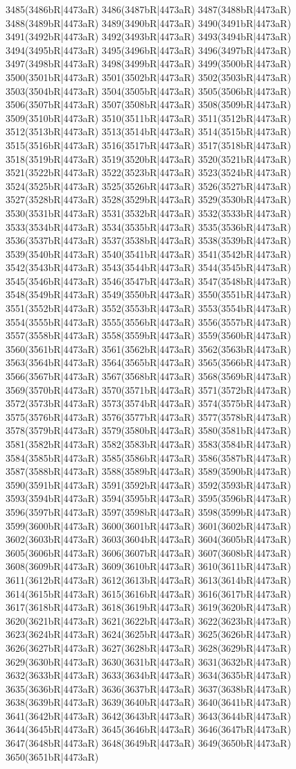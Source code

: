 3485(3486bR|4473aR) 3486(3487bR|4473aR) 3487(3488bR|4473aR) 3488(3489bR|4473aR) 3489(3490bR|4473aR) 3490(3491bR|4473aR) 3491(3492bR|4473aR) 3492(3493bR|4473aR) 3493(3494bR|4473aR) 3494(3495bR|4473aR) 3495(3496bR|4473aR) 3496(3497bR|4473aR) 3497(3498bR|4473aR) 3498(3499bR|4473aR) 3499(3500bR|4473aR) 3500(3501bR|4473aR) 3501(3502bR|4473aR) 3502(3503bR|4473aR) 3503(3504bR|4473aR) 3504(3505bR|4473aR) 3505(3506bR|4473aR) 3506(3507bR|4473aR) 3507(3508bR|4473aR) 3508(3509bR|4473aR) 3509(3510bR|4473aR) 3510(3511bR|4473aR) 3511(3512bR|4473aR) 3512(3513bR|4473aR) 3513(3514bR|4473aR) 3514(3515bR|4473aR) 3515(3516bR|4473aR) 3516(3517bR|4473aR) 3517(3518bR|4473aR) 3518(3519bR|4473aR) 3519(3520bR|4473aR) 3520(3521bR|4473aR) 3521(3522bR|4473aR) 3522(3523bR|4473aR) 3523(3524bR|4473aR) 3524(3525bR|4473aR) 3525(3526bR|4473aR) 3526(3527bR|4473aR) 3527(3528bR|4473aR) 3528(3529bR|4473aR) 3529(3530bR|4473aR) 3530(3531bR|4473aR) 3531(3532bR|4473aR) 3532(3533bR|4473aR) 3533(3534bR|4473aR) 3534(3535bR|4473aR) 3535(3536bR|4473aR) 3536(3537bR|4473aR) 3537(3538bR|4473aR) 3538(3539bR|4473aR) 3539(3540bR|4473aR) 3540(3541bR|4473aR) 3541(3542bR|4473aR) 3542(3543bR|4473aR) 3543(3544bR|4473aR) 3544(3545bR|4473aR) 3545(3546bR|4473aR) 3546(3547bR|4473aR) 3547(3548bR|4473aR) 3548(3549bR|4473aR) 3549(3550bR|4473aR) 3550(3551bR|4473aR) 3551(3552bR|4473aR) 3552(3553bR|4473aR) 3553(3554bR|4473aR) 3554(3555bR|4473aR) 3555(3556bR|4473aR) 3556(3557bR|4473aR) 3557(3558bR|4473aR) 3558(3559bR|4473aR) 3559(3560bR|4473aR) 3560(3561bR|4473aR) 3561(3562bR|4473aR) 3562(3563bR|4473aR) 3563(3564bR|4473aR) 3564(3565bR|4473aR) 3565(3566bR|4473aR) 3566(3567bR|4473aR) 3567(3568bR|4473aR) 3568(3569bR|4473aR) 3569(3570bR|4473aR) 3570(3571bR|4473aR) 3571(3572bR|4473aR) 3572(3573bR|4473aR) 3573(3574bR|4473aR) 3574(3575bR|4473aR) 3575(3576bR|4473aR) 3576(3577bR|4473aR) 3577(3578bR|4473aR) 3578(3579bR|4473aR) 3579(3580bR|4473aR) 3580(3581bR|4473aR) 3581(3582bR|4473aR) 3582(3583bR|4473aR) 3583(3584bR|4473aR) 3584(3585bR|4473aR) 3585(3586bR|4473aR) 3586(3587bR|4473aR) 3587(3588bR|4473aR) 3588(3589bR|4473aR) 3589(3590bR|4473aR) 3590(3591bR|4473aR) 3591(3592bR|4473aR) 3592(3593bR|4473aR) 3593(3594bR|4473aR) 3594(3595bR|4473aR) 3595(3596bR|4473aR) 3596(3597bR|4473aR) 3597(3598bR|4473aR) 3598(3599bR|4473aR) 3599(3600bR|4473aR) 3600(3601bR|4473aR) 3601(3602bR|4473aR) 3602(3603bR|4473aR) 3603(3604bR|4473aR) 3604(3605bR|4473aR) 3605(3606bR|4473aR) 3606(3607bR|4473aR) 3607(3608bR|4473aR) 3608(3609bR|4473aR) 3609(3610bR|4473aR) 3610(3611bR|4473aR) 3611(3612bR|4473aR) 3612(3613bR|4473aR) 3613(3614bR|4473aR) 3614(3615bR|4473aR) 3615(3616bR|4473aR) 3616(3617bR|4473aR) 3617(3618bR|4473aR) 3618(3619bR|4473aR) 3619(3620bR|4473aR) 3620(3621bR|4473aR) 3621(3622bR|4473aR) 3622(3623bR|4473aR) 3623(3624bR|4473aR) 3624(3625bR|4473aR) 3625(3626bR|4473aR) 3626(3627bR|4473aR) 3627(3628bR|4473aR) 3628(3629bR|4473aR) 3629(3630bR|4473aR) 3630(3631bR|4473aR) 3631(3632bR|4473aR) 3632(3633bR|4473aR) 3633(3634bR|4473aR) 3634(3635bR|4473aR) 3635(3636bR|4473aR) 3636(3637bR|4473aR) 3637(3638bR|4473aR) 3638(3639bR|4473aR) 3639(3640bR|4473aR) 3640(3641bR|4473aR) 3641(3642bR|4473aR) 3642(3643bR|4473aR) 3643(3644bR|4473aR) 3644(3645bR|4473aR) 3645(3646bR|4473aR) 3646(3647bR|4473aR) 3647(3648bR|4473aR) 3648(3649bR|4473aR) 3649(3650bR|4473aR) 3650(3651bR|4473aR) 